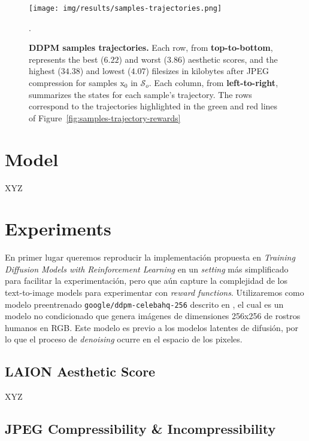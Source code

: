\begin{figure}[ht]
  \centering
  \texttt{[image: img/results/samples-trajectories.png]}
  \vspace{-18pt}  %
    \captionsetup{width=\textwidth} %
    \caption{\textbf{DDPM samples trajectories.} Each row, from \textbf{top-to-bottom}, represents the best ($6.22$)
  and worst ($3.86$) aesthetic scores, and the highest ($34.38$) and lowest 
  ($4.07$) filesizes in kilobytes after JPEG compression for samples
  $\mathrm{x}_{0}$ in $\mathcal{S}_{o}$. Each column, from \textbf{left-to-right}, summarizes the
  states for each sample's trajectory. The rows correspond to the trajectories
  highlighted in the green and red lines of Figure~\ref{fig:samples-trajectory-rewards}}.
    \label{fig:sample-trajectories}
\end{figure}

\section{Model}

XYZ

\section{Experiments}

En primer lugar queremos reproducir la implementación propuesta en \textit{Training Diffusion Models with Reinforcement Learning} \cite{black2023training} en un \textit{setting} más simplificado para facilitar
la experimentación, pero que aún capture la complejidad de los text-to-image models para experimentar con \textit{reward functions}. Utilizaremos como
modelo preentrenado \texttt{google/ddpm-celebahq-256} descrito
en \cite{ho2020denoising}, el cual es un modelo no condicionado que
genera imágenes de dimensiones 256x256 de rostros humanos en RGB. Este modelo es previo a los modelos latentes de difusión, por lo que el proceso de \textit{denoising} ocurre en el espacio de los pixeles.


\subsection{LAION Aesthetic Score}

 XYZ

 \subsection{JPEG Compressibility \& Incompressibility}

